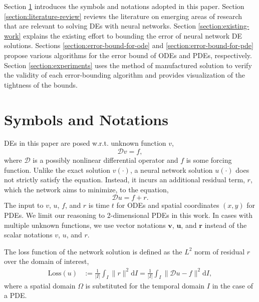 \documentclass[accepted]{uai2023}
\newcommand{\vect}[1]{\mathbf{#1}}
\newcommand{\Loss}{\mathrm{Loss}}
\begin{document}
    Section \ref{section:symbols-and-notations} introduces the symbols and notations adopted in this paper.
    Section \ref{section:literature-review} reviews the literature on emerging areas of research that are relevant to solving DEs with neural networks.
    Section \ref{section:existing-work} explains the existing effort to bounding the error of neural network DE solutions.
    Sections \ref{section:error-bound-for-ode} and \ref{section:error-bound-for-pde} propose various algorithms for the error bound of ODEs and PDEs, respectively.
    Section \ref{section:experiments} uses the method of manufactured solution to verify the validity of each error-bounding algorithm and provides visualization of the tightness of the bounds.

\section{Symbols and Notations} \label{section:symbols-and-notations}
    DEs in this paper are posed w.r.t. unknown function $v$,
    {
        \small
        \begin{equation*}
            \mathcal{D} v = f,
        \end{equation*}
    }
    where $\mathcal{D}$ is a possibly nonlinear differential operator and $f$ is some forcing function.
    Unlike the exact solution $v(\cdot)$, a neural network solution $u(\cdot)$ does not strictly satisfy the equation.
    Instead, it incurs an additional residual term, $r$, which the network aims to minimize, to the equation, 
    {
        \small
        \begin{equation*}
            \mathcal{D} u = f + r.
        \end{equation*}
    }
    The input to $v$, $u$, $f$, and $r$ is time $t$ for ODEs and spatial coordinates $(x, y)$ for PDEs.
    We limit our reasoning to 2-dimensional PDEs in this work.
    In cases with multiple unknown functions, we use vector notations $\vect{v}$, $\vect{u}$, and $\vect{r}$ instead of the scalar notations $v$, $u$, and $r$.

    The loss function of the network solution is defined as the $L^2$ norm of residual $r$ over the domain of interest,
    {
        \small
        \begin{align}
            \Loss{}(u) &:= \frac{1}{|I|} \int_{I} \|r\|^2 \mathrm{d}I = \frac{1}{|I|} \int_{I} \|\mathcal{D} u - f\|^2 \mathrm{d}I,
        \end{align}
    }
    where a spatial domain $\Omega$ is substituted for the temporal domain $I$ in the case of a PDE.
\end{document}
